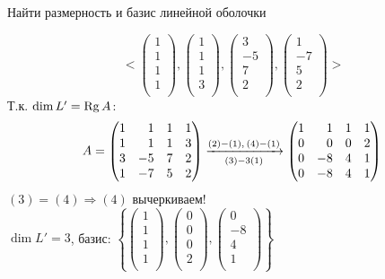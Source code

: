\begin{prim}
Найти размерность и базис линейной оболочки
\end{prim}
$$
<
\begin{pmatrix}
1\\ 
1\\ 
1\\ 
1\\
\end{pmatrix}
,
\begin{pmatrix}
1\\ 
1\\ 
1\\ 
3\\
\end{pmatrix}
,
\begin{pmatrix}
3\\ 
-5\\ 
7\\ 
2\\
\end{pmatrix}
,
\begin{pmatrix}
1\\ 
-7\\ 
5\\ 
2\\
\end{pmatrix}
>
$$
Т.к. $\dim L'=\operatorname{\mathop{Rg}} A$:
$$
A=
	\begin{pmatrix*}[r]
	 1 & 1 & 1 & 1 \\
	 1 & 1 & 1 & 3 \\
	 3 & -5 & 7 & 2 \\
	 1 & -7 & 5 & 2 \\ 
	\end{pmatrix*} 
\xrightarrow[(3)-3(1)]{ %
	(2)-(1),\\
	(4)-(1)}
	\begin{pmatrix*}[r]
	 1 & 1 & 1 & 1 \\
	 0 & 0 & 0 & 2 \\
	 0 & -8 & 4 & 1 \\
	 0 & -8 & 4 & 1 \\ 
	\end{pmatrix*} \\
$$
$(3)=(4) \Rightarrow (4)$ вычеркиваем!\\
$\dim  L'=3$, базис: $
\left\{
\begin{pmatrix}
1\\ 
1\\ 
1\\ 
1\\
\end{pmatrix}
,
\begin{pmatrix}
0\\ 
0\\ 
0\\ 
2\\
\end{pmatrix}
,
\begin{pmatrix}
0\\ 
-8\\ 
4\\ 
1\\
\end{pmatrix}
\right\}$

